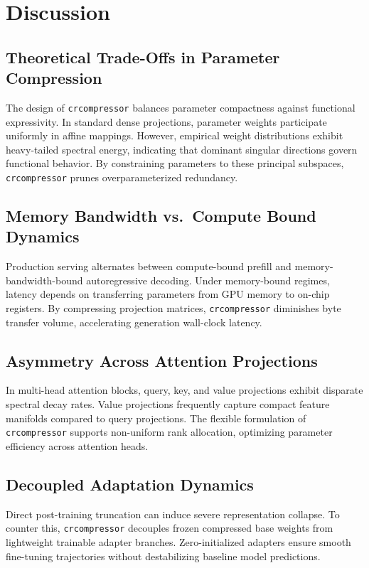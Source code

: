 \section{Discussion}

\subsection{Theoretical Trade-Offs in Parameter Compression}
The design of \texttt{crcompressor} balances parameter compactness against functional expressivity. In standard dense projections, parameter weights participate uniformly in affine mappings. However, empirical weight distributions exhibit heavy-tailed spectral energy, indicating that dominant singular directions govern functional behavior. By constraining parameters to these principal subspaces, \texttt{crcompressor} prunes overparameterized redundancy.

\subsection{Memory Bandwidth vs.\ Compute Bound Dynamics}
Production serving alternates between compute-bound prefill and memory-bandwidth-bound autoregressive decoding. Under memory-bound regimes, latency depends on transferring parameters from GPU memory to on-chip registers. By compressing projection matrices, \texttt{crcompressor} diminishes byte transfer volume, accelerating generation wall-clock latency.

\subsection{Asymmetry Across Attention Projections}
In multi-head attention blocks, query, key, and value projections exhibit disparate spectral decay rates. Value projections frequently capture compact feature manifolds compared to query projections. The flexible formulation of \texttt{crcompressor} supports non-uniform rank allocation, optimizing parameter efficiency across attention heads.

\subsection{Decoupled Adaptation Dynamics}
Direct post-training truncation can induce severe representation collapse. To counter this, \texttt{crcompressor} decouples frozen compressed base weights from lightweight trainable adapter branches. Zero-initialized adapters ensure smooth fine-tuning trajectories without destabilizing baseline model predictions.

